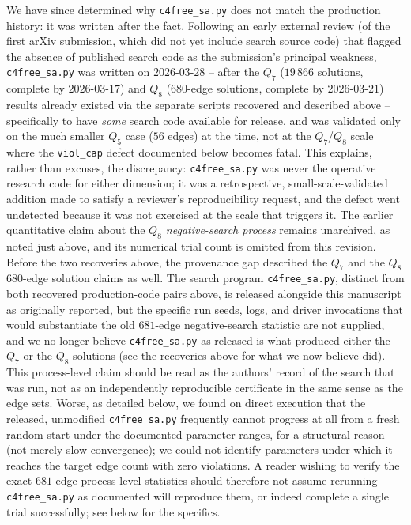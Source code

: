\documentclass[12pt]{article}
\begin{document}
We have since determined why \texttt{c4free\_sa.py} does not match the
production history: it was written after the fact. Following an
early external review (of the first arXiv submission, which did not
yet include search source code) that flagged the absence of published
search code as the submission's principal weakness, \texttt{c4free\_sa.py}
was written on $2026$-$03$-$28$ -- after the $Q_7$ ($19\,866$
solutions, complete by $2026$-$03$-$17$) and $Q_8$ ($680$-edge
solutions, complete by $2026$-$03$-$21$) results already existed via
the separate scripts recovered and described above -- specifically to
have \emph{some} search code available for release, and was validated
only on the much smaller $Q_5$ case ($56$ edges) at the time, not at
the $Q_7$/$Q_8$ scale where the \texttt{viol\_cap} defect documented
below becomes fatal. This explains, rather than excuses, the
discrepancy: \texttt{c4free\_sa.py} was never the operative research
code for either dimension; it was a retrospective, small-scale-validated
addition made to satisfy a reviewer's reproducibility request, and the
defect went undetected because it was not exercised at the scale that
triggers it. The earlier quantitative claim about the \emph{$Q_8$ negative-search
process} remains unarchived, as noted just above, and its numerical trial
count is omitted from this revision. Before the two recoveries above, the
provenance gap described the $Q_7$ and the $Q_8$ $680$-edge solution claims
as well. The
search program \texttt{c4free\_sa.py}, distinct from both recovered
production-code pairs above,
is released alongside
this manuscript as originally reported, but the specific run seeds, logs, and driver
invocations that would substantiate the old $681$-edge negative-search statistic are not supplied,
and we no longer believe \texttt{c4free\_sa.py} as released is what
produced either the $Q_7$ or the $Q_8$ solutions (see the recoveries
above for what we now believe did).
This process-level claim should be read as the authors' record of the
search that was run, not as an independently reproducible certificate in
the same sense as the edge sets. Worse, as detailed
below, we found
on direct execution that the released, unmodified
\texttt{c4free\_sa.py} frequently cannot progress at all from a fresh
random start under the documented parameter ranges, for a structural
reason (not merely slow convergence); we could not identify parameters
under which it reaches the target edge count with zero violations. A
reader wishing to verify the exact $681$-edge process-level statistics should
therefore not assume rerunning \texttt{c4free\_sa.py} as documented will
reproduce them, or indeed complete a single trial successfully; see
below for the specifics.
\end{document}
